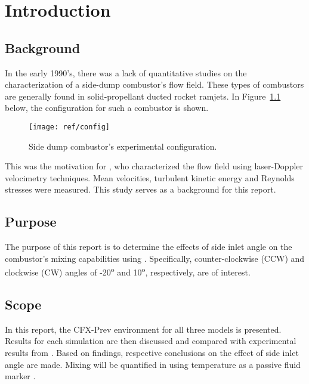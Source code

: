 \chapter{Introduction}
\label{ch:intro}

\section{Background}
\label{sect:background}

In the early 1990's, there was a lack of quantitative studies on the characterization of a side-dump combustor's flow field. These types of combustors are generally found in solid-propellant ducted rocket ramjets. In Figure~\ref{fig:config} below, the configuration for such a combustor is shown.

\begin{figure}[H]
	\centering
	\texttt{[image: ref/config]}
	\caption[Side-dump combustor's experimental configuration.]{Side dump combustor's experimental configuration. \cite{art}}
	\label{fig:config}
\end{figure}

This was the motivation for \cite{art}, who characterized the flow field using laser-Doppler velocimetry techniques. Mean velocities, turbulent kinetic energy and Reynolds stresses were measured. This study serves as a background for this report.

\section{Purpose}
\label{sect:purpose}

The purpose of this report is to determine the effects of side inlet angle on the combustor's mixing capabilities \cite{proj} using \cite{cfx}. Specifically, counter-clockwise (CCW) and clockwise (CW) angles of -20\textsuperscript{o} and 10\textsuperscript{o}, respectively, are of interest. 


\section{Scope}
In this report, the CFX-Prev environment for all three models is presented. Results for each simulation are then discussed and compared with experimental results from \cite{art}. Based on findings, respective conclusions on the effect of side inlet angle are made. Mixing will be quantified in using temperature as a passive fluid marker \cite{proj}.
